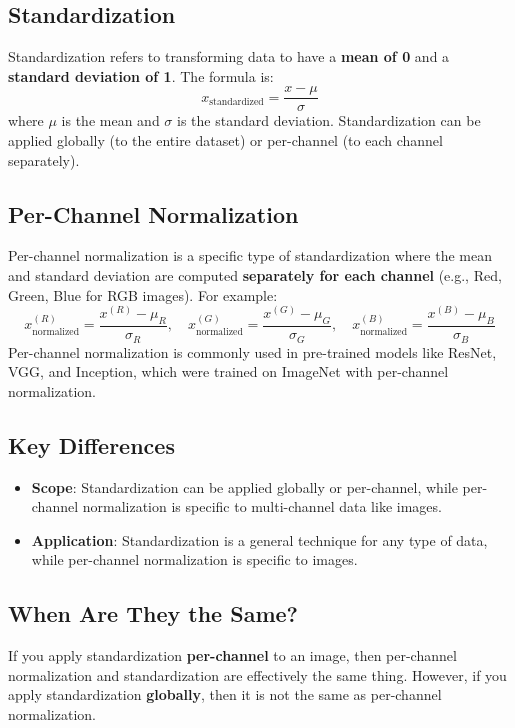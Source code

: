 \begin{notechapter}
\subsection{Standardization}
Standardization refers to transforming data to have a \textbf{mean of 0}
and a \textbf{standard deviation of 1}. The formula is:
\[
x_{\text{standardized}} = \frac{x - \mu}{\sigma}
\]
where \(\mu\) is the mean and \(\sigma\) is the standard deviation.
Standardization can be applied globally (to the entire dataset) or
per-channel (to each channel separately).

\subsection{Per-Channel Normalization}
Per-channel normalization is a specific type of standardization where
the mean and standard deviation are computed \textbf{separately for
each channel} (e.g., Red, Green, Blue for RGB images). For example:
\[
x_{\text{normalized}}^{(R)} = \frac{x^{(R)} - \mu_R}{\sigma_R}, \quad
x_{\text{normalized}}^{(G)} = \frac{x^{(G)} - \mu_G}{\sigma_G}, \quad
x_{\text{normalized}}^{(B)} = \frac{x^{(B)} - \mu_B}{\sigma_B}
\]
Per-channel normalization is commonly used in pre-trained models like
ResNet, VGG, and Inception, which were trained on ImageNet with
per-channel normalization.

\subsection{Key Differences}
\begin{itemize}
    \item \textbf{Scope}: Standardization can be applied globally or
          per-channel, while per-channel normalization is specific to
          multi-channel data like images.
    \item \textbf{Application}: Standardization is a general technique
          for any type of data, while per-channel normalization is
          specific to images.
\end{itemize}

\subsection{When Are They the Same?}
If you apply standardization \textbf{per-channel} to an image, then
per-channel normalization and standardization are effectively the
same thing. However, if you apply standardization \textbf{globally},
then it is not the same as per-channel normalization.


\end{notechapter}
